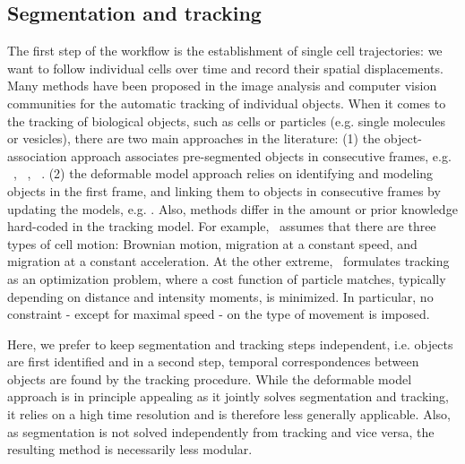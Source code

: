 \subsection{Segmentation and tracking}
\label{sec:motiw_seg}
\label{sec:celltracking}

%
The first step of the workflow is the establishment of single cell
trajectories: we want to follow individual cells over time and record
their spatial displacements. Many methods have been proposed in the
image analysis and computer vision communities for the automatic
tracking of individual objects. When it comes to the tracking of
biological objects, such as cells or particles (e.g.
single molecules or vesicles), there are two main approaches in the
literature: (1) the object-association approach associates
pre-segmented objects in consecutive frames, e.g. ~\cite{lou},
~\cite{citeulike:11229467}, ~\cite{Chenouard2014}. (2) the deformable
model approach relies on identifying and modeling objects in the first
frame, and linking them to objects in consecutive frames by updating
the models, e.g. \cite{pmid12585703}. Also, methods differ in the
amount or prior knowledge hard-coded in the tracking model. For
example,~\cite{pmid18656418} assumes that there are three types of
cell motion: Brownian motion, migration at a constant speed, and
migration at a constant acceleration. At the other
extreme,~\cite{pmid16043363} formulates tracking as an optimization
problem, where a cost function of particle matches, typically depending on distance and
intensity moments, is minimized.  
In particular, no constraint - except for maximal speed - on
the type of movement is imposed. 

Here, we prefer to keep segmentation and tracking
steps independent, i.e. objects are first 
identified and in a second step, temporal correspondences between objects are
found by the tracking procedure. 
While the deformable model approach is in principle appealing as it jointly
solves segmentation and tracking, it relies on a high time
resolution and is therefore less generally applicable. Also, as
segmentation is not solved independently from tracking and vice versa,
the resulting method is necessarily less modular.  

